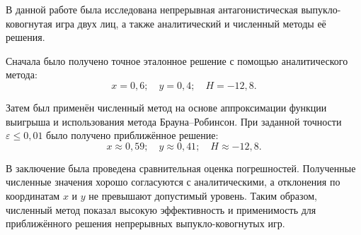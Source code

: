 \conclusion

В данной работе была исследована непрерывная антагонистическая выпукло-ковогнутая игра
двух лиц, а также аналитический и численный методы её решения.

Сначала было получено точное эталонное решение с помощью аналитического метода:
\[
x = 0{,}6;\quad y = 0{,}4;\quad H = -12{,}8.
\]

Затем был применён численный метод на основе аппроксимации функции выигрыша и
использования метода Брауна–Робинсон. При заданной точности \(\varepsilon \leq 0{,}01\)
было получено приближённое решение:
\[
x \approx 0{,}59;\quad y \approx 0{,}41;\quad H \approx -12{,}8.
\]

В заключение была проведена сравнительная оценка погрешностей. Полученные численные
значения хорошо согласуются с аналитическими, а отклонения по координатам \(x\) и \(y\)
не превышают допустимый уровень. Таким образом, численный метод показал высокую
эффективность и применимость для приближённого решения непрерывных выпукло-ковогнутых
игр.
